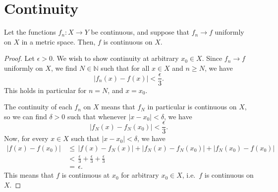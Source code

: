 \documentclass[11pt]{article}
\def\N{\mathbb{N}}
\theoremstyle{definition}
\theoremstyle{remark}
\numberwithin{equation}{module}
\begin{document}
    \section{Continuity}
    \begin{theorem}
        Let the functions $f_n\colon X \to Y$ be continuous, and suppose that 
        $f_n \to f$ uniformly on $X$ in a metric space. Then, $f$ is continuous on
        $X$.
    \end{theorem}
    \begin{proof}
        Let $\epsilon > 0$. We wish to show continuity at arbitrary $x_0 \in X$.
        Since $f_n \to f$ uniformly on $X$, we find $N \in \N$ such that for all $x
        \in X$ and $n \geq N$, we have \[
            |f_n(x) - f(x)| < \frac{\epsilon}{3}.
        \] This holds in particular for $n = N$, and $x = x_0$.
        
        The continuity of each $f_n$ on $X$ means that $f_N$ in particular is
        continuous on $X$, so we can find $\delta > 0$ such that whenever 
        $|x - x_0| < \delta$, we have \[
            |f_N(x) - f_N(x_0)| < \frac{\epsilon}{3}.
        \] Now, for every $x \in X$ such that $|x - x_0| < \delta$, we have
        \begin{align*}
            |f(x) - f(x_0)| 
                \,&\leq\, |f(x) - f_N(x)| + |f_N(x) - f_N(x_0)| + 
                    |f_N(x_0) - f(x_0)| \\
                \,&<\, \frac{\epsilon}{3} + \frac{\epsilon}{3} +
                    \frac{\epsilon}{3} \\
                \,&=\, \epsilon.
        \end{align*}
        This means that $f$ is continuous at $x_0$ for arbitrary $x_0 \in X$, i.e.\
        $f$ is continuous on $X$.
    \end{proof}
    
\end{document}
